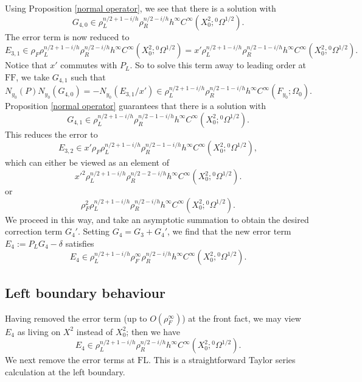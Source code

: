 \documentclass[10pt, a4paper, twoside]{amsart}
\numberwithin{equation}{section}
\theoremstyle{remark}
\begin{document}
Using Proposition \ref{normal operator}, we see that there is a solution with 
$$
G_{4, 0} \in \rho_{L}^{n/2 + 1 -i/h} \rho_R^{n/2 -i/h} h^\infty C^\infty(X^2_0; {{}^0\Omega^{1/2}}).
$$
The error term is now reduced to 
$$
E_{3, 1} \in \rho_F \rho_{L}^{n/2 + 1 -i/h} \rho_R^{n/2 -i/h}  h^\infty C^\infty(X^2_0; {{}^0\Omega^{1/2}}) = x' \rho_{L}^{n/2 + 1 -i/h} \rho_R^{n/2-1 -i/h}  h^\infty C^\infty(X^2_0; {{}^0\Omega^{1/2}}) .
$$
Notice that $x'$ commutes with $P_L$. So to solve this term away to leading order at ${\mathrm{FF}}$, we take $G_{4, 1}$ such that 
\begin{equation}
N_{y_0}(P) N_{y_0}(G_{4, 0}) = -N_{y_0} (E_{3, 1}/x') \in \rho_{L}^{n/2 + 1 -i/h} \rho_R^{n/2 -1 -i/h} h^\infty C^\infty(F_{y_0}; \Omega_0).
\end{equation}
Proposition \ref{normal operator} guarantees that there is a solution with 
$$
G_{4, 1} \in \rho_{L}^{n/2 + 1 -i/h} \rho_R^{n/2-1 -i/h} h^\infty C^\infty(X^2_0; {{}^0\Omega^{1/2}}).
$$
This reduces the error to 
$$
E_{3, 2} \in x' \rho_F \rho_{L}^{n/2 + 1 -i/h} \rho_R^{n/2-1 -i/h}  h^\infty C^\infty(X^2_0; {{}^0\Omega^{1/2}}),
$$
which can either be viewed as an element of 
$${x'}^2 \rho_{L}^{n/2 + 1 -i/h} \rho_R^{n/2-2 -i/h}  h^\infty C^\infty(X^2_0; {{}^0\Omega^{1/2}}) .
$$
or  
$$
\rho_F^2 \rho_{L}^{n/2 + 1 -i/h} \rho_R^{n/2 -i/h}  h^\infty C^\infty(X^2_0; {{}^0\Omega^{1/2}}). 
$$
We proceed in this way, and take an asymptotic summation to obtain the desired correction term $G_4'$.  Setting $G_4 = G_3 + G_4'$, we find that the new error term
$
E_4 := P_L G_4 - \delta
$
satisfies
$$
E_4 \in \rho_{L}^{n/2 + 1 -i/h} \rho_F^{\infty} \rho_R^{n/2 -i/h} h^\infty C^\infty(X^2_0; {{}^0\Omega^{1/2}}) .
$$

\subsection{Left boundary behaviour}

Having removed the error term (up to $O(\rho_F^\infty)$) at the front fact, we may view $E_4$ as living on $X^2$ instead of $X^2_0$; then we have
$$
E_4 \in \rho_{L}^{n/2 + 1 -i/h}  \rho_R^{n/2 -i/h} h^\infty C^\infty(X^2_0; {{}^0\Omega^{1/2}}) .
$$
We next remove the error terms at ${\mathrm{FL}}$. This is a straightforward Taylor series calculation at the left boundary. 
\end{document}
